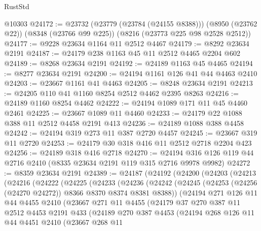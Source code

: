 \begin{lexlean}{RustStd}
\begin{coremodule}
    @10303
@24172 := @23732
    (@23779 (@23784 (@24155 @8388)))
    (@8950 (@23762 @22))
    (@8348 (@23766 @99 @225))
    (@8216 (@23773 @225 @98 @2528 @2512))
@24177 := @9228 @23634 @1164 @11 @2512 @4467
@24179 := @8292 @23634 @2191
@24187 := @24179 @238 @1163 @45 @11 @2512 @4465 @2204 @602
@24189 := @8268 @23634 @2191
@24192 := @24189 @1163 @45 @4465
@24194 := @8277 @23634 @2191
@24200 := @24194 @1161 @126 @41 @44 @4463 @2410
@24203 := @23667 @1161 @41 @4463
@24205 := @8248 @23634 @2191
@24213 := @24205 @110 @41 @1160 @8254 @2512 @4462 @2395 @8263
@24216 := @24189 @1160 @8254 @4462
@24222 := @24194 @1089 @171 @11 @45 @4460 @2461
@24225 := @23667 @1089 @11 @4460
@24233 := @24179 @22 @1088 @388 @11 @2512 @4458 @2191 @413
@24236 := @24189 @1088 @388 @4458
@24242 := @24194 @319 @273 @11 @387 @2720 @4457
@24245 := @23667 @319 @11 @2720
@24253 := @24179 @30 @318 @416 @11 @2512 @2718 @2204 @423
@24256 := @24189 @318 @416 @2718
@24270 := @24194 @316 @126 @119 @44 @2716 @2410 (@8335 @23634 @2191 @119 @315 @2716 @9978 @9982)
@24272 := @8359 @23634 @2191
@24389 := @24187
    (@24192
      (@24200
        (@24203
          (@24213
            (@24216
              (@24222
                (@24225
                  (@24233
                    (@24236
                      (@24242
                        (@24245 (@24253 (@24256 (@24270 @24272)) @8366 @8370 @8374 @8381 @8388))
                        (@24194
                          @271
                          @126
                          @11
                          @44
                          @4455
                          @2410
                          (@23667
                            @271
                            @11
                            @4455
                            (@24179
                              @37
                              @270
                              @387
                              @11
                              @2512
                              @4453
                              @2191
                              @433
                              (@24189
                                @270
                                @387
                                @4453
                                (@24194
                                  @268
                                  @126
                                  @11
                                  @44
                                  @4451
                                  @2410
                                  (@23667
                                    @268
                                    @11

\end{coremodule}
\end{lexlean}
